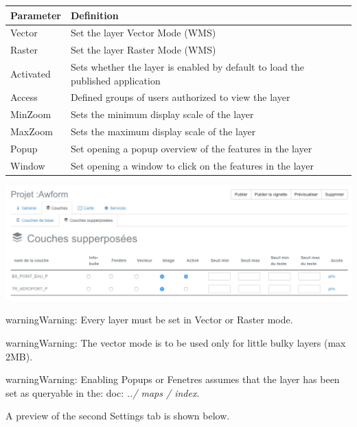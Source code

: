 \documentclass[letterpaper,10pt,english]{sphinxmanual}
\begin{document}
\begin{tabulary}{\linewidth}{|L|L|}
\hline

\textbf{Parameter}
 & 
\textbf{Definition}
\\
\hline
Vector
 & 
Set the layer Vector Mode (WMS)
\\
\hline
Raster
 & 
Set the layer Raster Mode (WMS)
\\
\hline
Activated
 & 
Sets whether the layer is enabled by default to load the published application
\\
\hline
Access
 & 
Defined groups of users authorized to view the layer
\\
\hline
MinZoom
 & 
Sets the minimum display scale of the layer
\\
\hline
MaxZoom
 & 
Sets the maximum display scale of the layer
\\
\hline
Popup
 & 
Set opening a popup overview of the features in the layer
\\
\hline
Window
 & 
Set opening a window to click on the features in the layer
\\
\hline\end{tabulary}


\includegraphics[width=1.000\linewidth]{publisher-overlays-conf.png}

\begin{notice}{warning}{Warning:}
Every layer must be set in Vector or Raster mode.
\end{notice}

\begin{notice}{warning}{Warning:}
The vector mode is to be used only for little bulky layers (max 2MB).
\end{notice}

\begin{notice}{warning}{Warning:}
Enabling Popups or Fenetres assumes that the layer has been set as queryable in the: doc: \emph{../ maps / index}.
\end{notice}

A preview of the second Settings tab is shown below.
\end{document}
